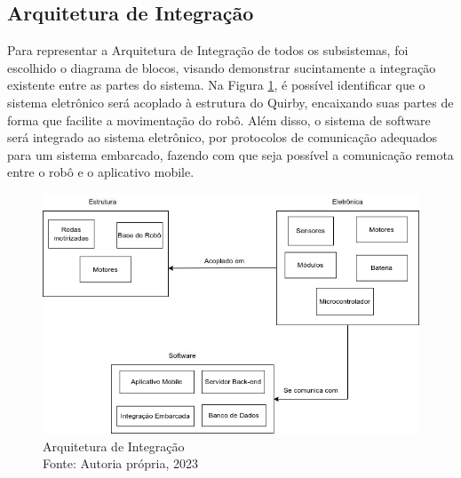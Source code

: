 \subsection{Arquitetura de Integração}
Para representar a Arquitetura de Integração de todos os subsistemas, foi escolhido o diagrama de blocos, visando demonstrar sucintamente a integração existente entre as partes do sistema. Na Figura \ref{fig8}, é possível identificar que o sistema eletrônico será acoplado à estrutura do Quirby, encaixando suas partes de forma que facilite a movimentação do robô. Além disso, o sistema de software será integrado ao sistema eletrônico, por protocolos de comunicação adequados para um sistema embarcado, fazendo com que seja possível  a comunicação remota entre o robô e o aplicativo mobile.

\begin{figure}[h!]
    \centering
    \includegraphics[width=15cm]{figuras/Diagrama sem nome.drawio.png}
    \caption{Arquitetura de Integração \\ Fonte: Autoria própria, 2023}
    \label{fig8}
\end{figure}